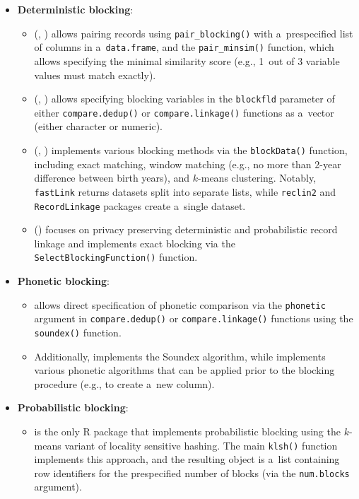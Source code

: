\begin{itemize}
\tightlist
\item
  \textbf{Deterministic blocking}:

  \begin{itemize}
  \tightlist
  \item
     (\citet{reclin2}, \citet{reclin2-rjournal}) allows pairing
    records using \texttt{pair\_blocking()} with a~prespecified list of
    columns in a~\texttt{data.frame}, and the \texttt{pair\_minsim()} function,
    which allows specifying the minimal similarity score (e.g., 1~out of 3
    variable values must match exactly).
  \item
     (\citet{RecordLinkage}, \citet{RecordLinkage-rjournal}) allows specifying blocking variables in
    the \texttt{blockfld} parameter of either \texttt{compare.dedup()} or
    \texttt{compare.linkage()} functions as a~vector (either character or
    numeric).
  \item
     (\citet{fastLink}, \citet{enamorado2019using}) implements
    various blocking methods via the \texttt{blockData()} function,
    including exact matching, window matching (e.g., no more than
    2-year difference between birth years), and \(k\)-means
    clustering. Notably, \texttt{fastLink} returns datasets split into
    separate lists, while \texttt{reclin2} and \texttt{RecordLinkage} packages
    create a~single dataset.
  \item
     (\citet{PPRL}) focuses on privacy preserving
    deterministic and probabilistic record linkage and implements
    exact blocking via the \texttt{SelectBlockingFunction()} function.
  \end{itemize}
\item
  \textbf{Phonetic blocking}:

  \begin{itemize}
  \tightlist
  \item
     allows direct specification of phonetic
    comparison via the \texttt{phonetic} argument in \texttt{compare.dedup()} or
    \texttt{compare.linkage()} functions using the \texttt{soundex()} function.
  \item
    Additionally,  \citep{stringdist} implements the
    Soundex algorithm, while  \citep{phonics}
    implements various phonetic algorithms that can be applied prior
    to the blocking procedure (e.g., to create a~new column).
  \end{itemize}
\item
  \textbf{Probabilistic blocking}:

  \begin{itemize}
  \tightlist
  \item
     \citep{klsh} is the only R package that implements
    probabilistic blocking using the \(k\)-means variant of locality
    sensitive hashing. The main \texttt{klsh()} function implements this
    approach, and the resulting object is a~list containing row
    identifiers for the prespecified number of blocks (via the
    \texttt{num.blocks} argument).
  \end{itemize}
\end{itemize}

